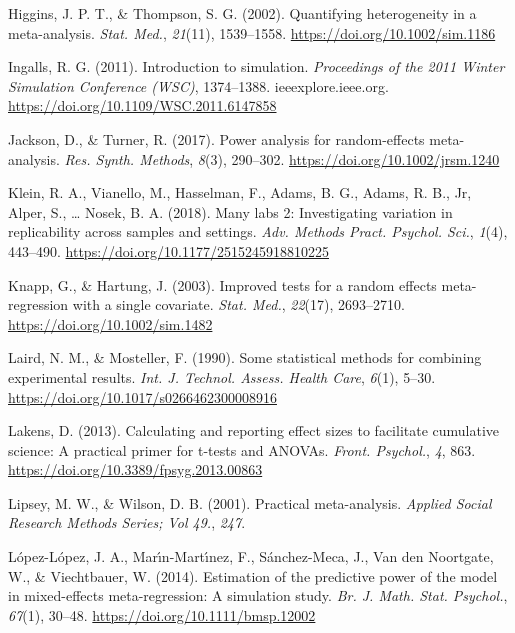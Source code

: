 \documentclass[
  man,floatsintext]{apa6}
\newlength{\cslhangindent}
\newlength{\cslentryspacingunit} %
\newenvironment{CSLReferences}[2] %
 {%
  \setlength{\parindent}{0pt}
  \ifodd #1
  \let\oldpar\par
  \def\par{\hangindent=\cslhangindent\oldpar}
  \fi
  \setlength{\parskip}{#2\cslentryspacingunit}
 }%
 {}
\begin{document}
\begin{CSLReferences}{1}{0}
\leavevmode{}%
Higgins, J. P. T., \& Thompson, S. G. (2002). Quantifying heterogeneity in a meta-analysis. \emph{Stat. Med.}, \emph{21}(11), 1539--1558. \url{https://doi.org/10.1002/sim.1186}

\leavevmode{}%
Ingalls, R. G. (2011). Introduction to simulation. \emph{Proceedings of the 2011 Winter Simulation Conference ({WSC})}, 1374--1388. ieeexplore.ieee.org. \url{https://doi.org/10.1109/WSC.2011.6147858}

\leavevmode{}%
Jackson, D., \& Turner, R. (2017). Power analysis for random-effects meta-analysis. \emph{Res. Synth. Methods}, \emph{8}(3), 290--302. \url{https://doi.org/10.1002/jrsm.1240}

\leavevmode{}%
Klein, R. A., Vianello, M., Hasselman, F., Adams, B. G., Adams, R. B., Jr, Alper, S., \ldots{} Nosek, B. A. (2018). Many labs 2: Investigating variation in replicability across samples and settings. \emph{Adv. Methods Pract. Psychol. Sci.}, \emph{1}(4), 443--490. \url{https://doi.org/10.1177/2515245918810225}

\leavevmode{}%
Knapp, G., \& Hartung, J. (2003). Improved tests for a random effects meta-regression with a single covariate. \emph{Stat. Med.}, \emph{22}(17), 2693--2710. \url{https://doi.org/10.1002/sim.1482}

\leavevmode{}%
Laird, N. M., \& Mosteller, F. (1990). Some statistical methods for combining experimental results. \emph{Int. J. Technol. Assess. Health Care}, \emph{6}(1), 5--30. \url{https://doi.org/10.1017/s0266462300008916}

\leavevmode{}%
Lakens, D. (2013). Calculating and reporting effect sizes to facilitate cumulative science: A practical primer for t-tests and {ANOVAs}. \emph{Front. Psychol.}, \emph{4}, 863. \url{https://doi.org/10.3389/fpsyg.2013.00863}

\leavevmode{}%
Lipsey, M. W., \& Wilson, D. B. (2001). Practical meta-analysis. \emph{Applied Social Research Methods Series; Vol 49.}, \emph{247}.

\leavevmode{}%
López-López, J. A., Marı́n-Martı́nez, F., Sánchez-Meca, J., Van den Noortgate, W., \& Viechtbauer, W. (2014). Estimation of the predictive power of the model in mixed-effects meta-regression: A simulation study. \emph{Br. J. Math. Stat. Psychol.}, \emph{67}(1), 30--48. \url{https://doi.org/10.1111/bmsp.12002}


\end{CSLReferences}
\end{document}
